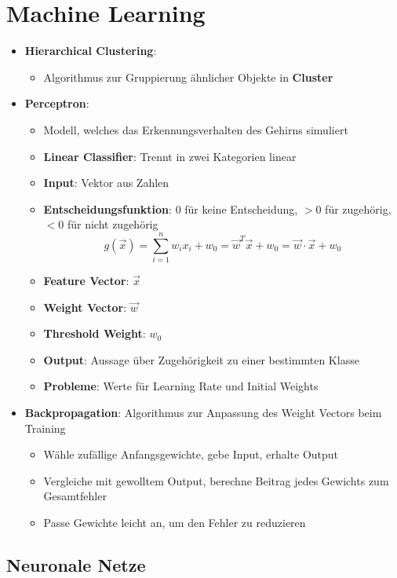 \section{Machine Learning}%
\label{ml:sec:machine-learning}

\begin{itemize}
	\item \textbf{Hierarchical Clustering}:
	\begin{itemize}
		\item Algorithmus zur Gruppierung ähnlicher Objekte in \textbf{Cluster}
	\end{itemize}
	\item \textbf{Perceptron}:
	\begin{itemize}
		\item Modell, welches das Erkennungsverhalten des Gehirns simuliert
		\item \textbf{Linear Classifier}: Trennt in zwei Kategorien linear
		\item \textbf{Input}: Vektor aus Zahlen
		\item \textbf{Entscheidungsfunktion}: $0$ für keine Entscheidung, $> 0$ für zugehörig, $< 0$ für nicht zugehörig
		$$
			g(\vec{x}) = \sum^n_{i=1}w_ix_i + w_0 = \vec{w}^T\vec{x} + w_0 = \vec{w} \cdot \vec{x} + w_0
		$$
		\item \textbf{Feature Vector}: $\vec{x}$
		\item \textbf{Weight Vector}: $\vec{w}$
		\item \textbf{Threshold Weight}: $w_0$
		\item \textbf{Output}: Aussage über Zugehörigkeit zu einer bestimmten Klasse
		\item \textbf{Probleme}: Werte für Learning Rate und Initial Weights
	\end{itemize}
	\item \textbf{Backpropagation}: Algorithmus zur Anpassung des Weight Vectors beim Training
	\begin{itemize}
		\item Wähle zufällige Anfangsgewichte, gebe Input, erhalte Output
		\item Vergleiche mit gewolltem Output, berechne Beitrag jedes Gewichts zum Gesamtfehler
		\item Passe Gewichte leicht an, um den Fehler zu reduzieren
	\end{itemize}
\end{itemize}

\subsection{Neuronale Netze}%
\label{ml:sub:neuronale_netze}

